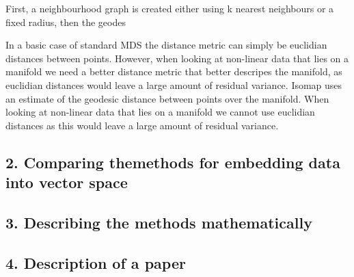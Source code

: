 \documentclass{article}
\begin{document}
First, a neighbourhood graph is created either using k nearest neighbours or a fixed radius, then the geodes

 In a basic case of standard MDS the distance metric can simply be euclidian distances between points. However, when looking at non-linear data that lies on a manifold we need a better distance metric that better descripes the manifold, as euclidian distances would leave a large amount of residual variance. Isomap uses an estimate of the geodesic distance between points over the manifold. 
 When looking at non-linear data that lies on a manifold we cannot use euclidian distances as this would leave a large amount of residual variance.
	\subsection{2. Comparing themethods for embedding data into vector space}
	\subsection{3. Describing the methods mathematically}
	\subsection{4. Description of a paper}
	
\end{document}
